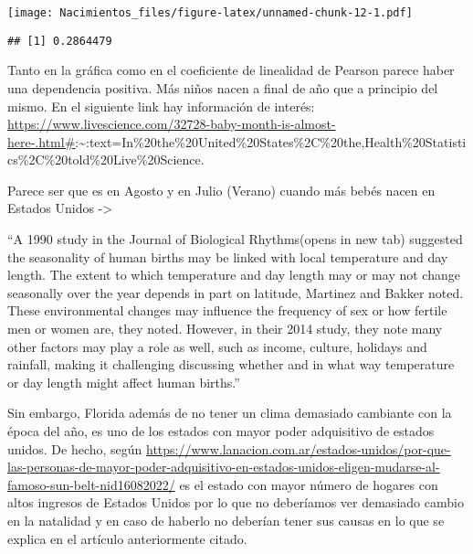 \documentclass[
]{article}
\newenvironment{Shaded}{\begin{snugshade}}{\end{snugshade}}
\newcommand{\FunctionTok}[1]{\textcolor[rgb]{0.00,0.00,0.00}{#1}}
\newcommand{\NormalTok}[1]{#1}
\newcommand{\OtherTok}[1]{\textcolor[rgb]{0.56,0.35,0.01}{#1}}
\newcommand{\SpecialCharTok}[1]{\textcolor[rgb]{0.00,0.00,0.00}{#1}}
\begin{document}
\texttt{[image: Nacimientos\_files/figure-latex/unnamed-chunk-12-1.pdf]}

\begin{Shaded}
\end{Shaded}

\begin{verbatim}
## [1] 0.2864479
\end{verbatim}

Tanto en la gráfica como en el coeficiente de linealidad de Pearson
parece haber una dependencia positiva. Más niños nacen a final de año
que a principio del mismo. En el siguiente link hay información de
interés:
\url{https://www.livescience.com/32728-baby-month-is-almost-here-.html\#}:\textasciitilde:text=In\%20the\%20United\%20States\%2C\%20the,Health\%20Statistics\%2C\%20told\%20Live\%20Science.

Parece ser que es en Agosto y en Julio (Verano) cuando más bebés nacen
en Estados Unidos -\textgreater{}

``A 1990 study in the Journal of Biological Rhythms(opens in new tab)
suggested the seasonality of human births may be linked with local
temperature and day length. The extent to which temperature and day
length may or may not change seasonally over the year depends in part on
latitude, Martinez and Bakker noted. These environmental changes may
influence the frequency of sex or how fertile men or women are, they
noted. However, in their 2014 study, they note many other factors may
play a role as well, such as income, culture, holidays and rainfall,
making it challenging discussing whether and in what way temperature or
day length might affect human births.''

Sin embargo, Florida además de no tener un clima demasiado cambiante con
la época del año, es uno de los estados con mayor poder adquisitivo de
estados unidos. De hecho, según
\url{https://www.lanacion.com.ar/estados-unidos/por-que-las-personas-de-mayor-poder-adquisitivo-en-estados-unidos-eligen-mudarse-al-famoso-sun-belt-nid16082022/}
es el estado con mayor número de hogares con altos ingresos de Estados
Unidos por lo que no deberíamos ver demasiado cambio en la natalidad y
en caso de haberlo no deberían tener sus causas en lo que se explica en
el artículo anteriormente citado.
\end{document}

